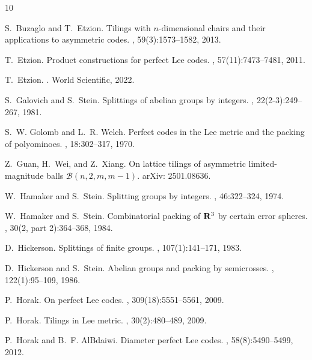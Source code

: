 \documentclass[12pt]{article}
\begin{document}
\begin{thebibliography}{10}
	
	S.~Buzaglo and T.~Etzion.
	\newblock Tilings with {$n$}-dimensional chairs and their applications to
	asymmetric codes.
	, 59(3):1573--1582, 2013.
	
	T.~Etzion.
	\newblock Product constructions for perfect {L}ee codes.
	, 57(11):7473--7481, 2011.
	
	T.~Etzion.
	.
	\newblock World Scientific, 2022.
	
	S.~Galovich and S.~Stein.
	\newblock Splittings of abelian groups by integers.
	, 22(2-3):249--267, 1981.
	
	S.~W. Golomb and L.~R. Welch.
	\newblock Perfect codes in the {L}ee metric and the packing of polyominoes.
	, 18:302--317, 1970.
	
	Z.~Guan, H.~Wei, and Z.~Xiang.
	\newblock On lattice tilings of asymmetric limited-magnitude balls
	{$\mathcal{B}(n,2,m,m-1)$}.
	\newblock arXiv: 2501.08636.
	
	W.~Hamaker and S.~Stein.
	\newblock Splitting groups by integers.
	, 46:322--324, 1974.
	
	W.~Hamaker and S.~Stein.
	\newblock Combinatorial packing of {${\bf R}^{3}$} by certain error spheres.
	, 30(2, part 2):364--368, 1984.
	
	D.~Hickerson.
	\newblock Splittings of finite groups.
	, 107(1):141--171, 1983.
	
	D.~Hickerson and S.~Stein.
	\newblock Abelian groups and packing by semicrosses.
	, 122(1):95--109, 1986.
	
	P.~Horak.
	\newblock On perfect {L}ee codes.
	, 309(18):5551--5561, 2009.
	
	P.~Horak.
	\newblock Tilings in {L}ee metric.
	, 30(2):480--489, 2009.
	
	P.~Horak and B.~F. AlBdaiwi.
	\newblock Diameter perfect {L}ee codes.
	, 58(8):5490--5499, 2012.
	

\end{thebibliography}
\end{document}
